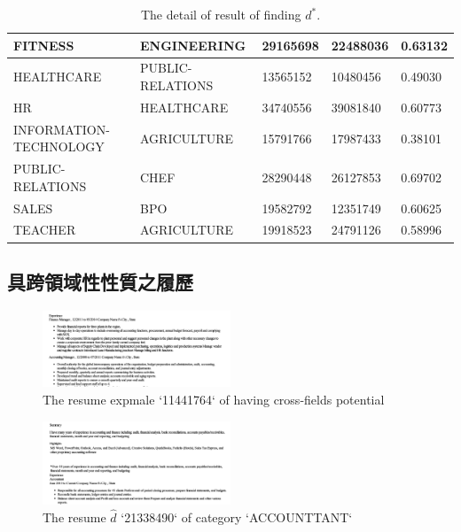 \documentclass[sigconf]{acmart}
\begin{document}
\begin{table}[t]
{\begin{tabular}{|l|l|l|l|l|}
FITNESS                & ENGINEERING            & 29165698   & 22488036    & 0.63132 \\ \hline
HEALTHCARE             & PUBLIC-RELATIONS       & 13565152   & 10480456    & 0.49030 \\ \hline
HR                     & HEALTHCARE             & 34740556   & 39081840    & 0.60773 \\ \hline
INFORMATION-TECHNOLOGY & AGRICULTURE            & 15791766   & 17987433    & 0.38101 \\ \hline
PUBLIC-RELATIONS       & CHEF                   & 28290448   & 26127853    & 0.69702 \\ \hline
SALES                  & BPO                    & 19582792   & 12351749    & 0.60625 \\ \hline
TEACHER                & AGRICULTURE            & 19918523   & 24791126    & 0.58996 \\ \hline
\end{tabular}%
}
\caption{The detail of result of finding $d^{*}$.}
\label{table:1}
\end{table}


\subsection{具跨領域性性質之履歷}

\begin{figure}[t]
    \centerline{\includegraphics[width=0.5\textwidth]{cross_fields.png}}
    \caption{The resume expmale `11441764` of having cross-fields potential}
    \label{cross_fields}
\end{figure}

\begin{figure}[t]
    \centerline{\includegraphics[width=0.5\textwidth]{resume_d_hat.png}}
    \caption{The resume $\hat{d}$ `21338490` of category `ACCOUNTTANT`}
    \label{resume_d_hat}
\end{figure}
\end{document}
